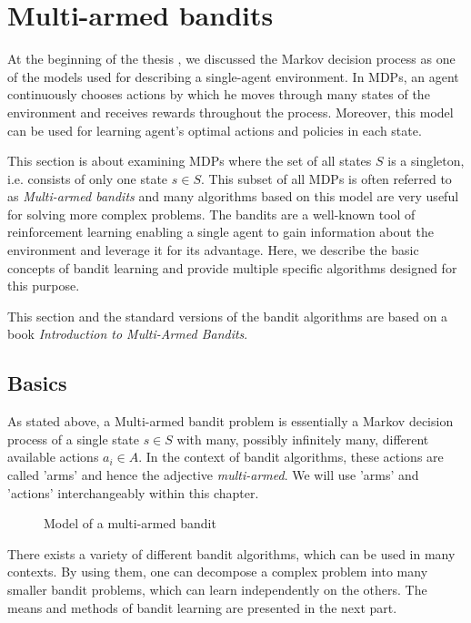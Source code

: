 \documentclass[../main.tex]{subfiles}
\begin{document}
\chapter{Multi-armed bandits}\label{bandit}

At the beginning of the thesis , we discussed the Markov decision process as one of the models used for describing a single-agent environment.
In MDPs, an agent continuously chooses actions by which he moves through many states of the environment and receives rewards throughout the process.
Moreover, this model can be used for learning agent's optimal actions and policies in each state.

This section is about examining MDPs where the set of all states $S$ is a singleton, i.e. consists of only one state $s \in S$.
This subset of all MDPs is often referred to as \textit{Multi-armed bandits} and many algorithms based on this model are very useful for solving more complex problems.
The bandits are a well-known tool of reinforcement learning enabling a single agent to gain information about the environment and leverage it for its advantage.
Here, we describe the basic concepts of bandit learning and provide multiple specific algorithms designed for this purpose.

This section and the standard versions of the bandit algorithms are based on a book \textit{Introduction to Multi-Armed Bandits}\cite{bandits}.

\section{Basics}\label{bandit:basics}
As stated above, a Multi-armed bandit problem is essentially a Markov decision process of a single state $s \in S$ with many, possibly infinitely many, different available actions $a_i \in A$.
In the context of bandit algorithms, these actions are called 'arms' and hence the adjective \textit{multi-armed}.
We will use 'arms' and 'actions' interchangeably within this chapter.
\begin{figure}[ht]
    \centering
    \caption{Model of a multi-armed bandit}
    \label{bandit:basics:model}
\end{figure}
There exists a variety of different bandit algorithms, which can be used in many contexts.
By using them, one can decompose a complex problem into many smaller bandit problems, which can learn independently on the others.
The means and methods of bandit learning are presented in the next part.
\end{document}
